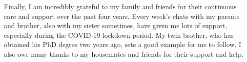 Finally, I am incredibly grateful to my family and friends for their continuous care and support over the past four years. Every week's chats with my parents and brother, also with my sister sometimes, have given me lots of support, especially during the COVID-19 lockdown period. My twin brother, who has obtained his PhD degree two years ago, sets a good example for me to follow. I also owe many thanks to my housemates and friends for their support and help.


% 
%

%

\newpage
\pagestyle{fancy}
\bgroup
\hypersetup{linkcolor=black}
\setcounter{tocdepth}{2}
\tableofcontents
\egroup

\newpage
{}
\bgroup
\hypersetup{linkcolor=black}
\listoftables
\egroup

